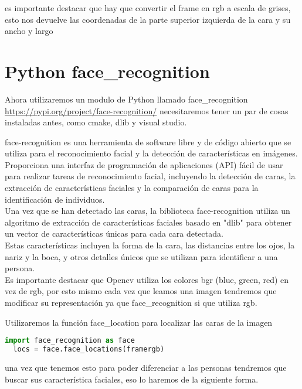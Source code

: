 es importante destacar que hay que convertir el frame en rgb a escala de grises,
esto nos devuelve las coordenadas de la parte superior izquierda de la cara y su 
ancho y largo




\section{Python face\_recognition}

Ahora utilizaremos un modulo de Python llamado face\_recognition
\url{https://pypi.org/project/face-recognition/}
necesitaremos tener un par de cosas instaladas antes, como cmake, dlib y visual studio.

face-recognition es una herramienta de software libre y de código abierto
que se utiliza para el reconocimiento facial y la detección de características en imágenes.\\

Proporciona una interfaz de programación de aplicaciones (API) fácil de usar
para realizar tareas de reconocimiento facial, incluyendo la detección de caras,
la extracción de características faciales y la comparación de caras para
la identificación de individuos.\\

Una vez que se han detectado las caras, la biblioteca face-recognition
utiliza un algoritmo de extracción de características faciales basado en 
"dlib" para obtener un vector de características únicas para cada cara detectada.\\
Estas características incluyen la forma de la cara, las distancias entre los ojos,
la nariz y la boca, y otros detalles únicos que se utilizan para identificar a una persona.\\

Es importante destacar que Opencv utiliza los colores bgr (blue, green, red)
en vez de rgb, por esto mismo cada vez que leamos una imagen tendremos que modificar 
su representación ya que face\_recognition si que utiliza rgb.

Utilizaremos la función face\_location para localizar las caras de la imagen
\begin{lstlisting}[language=Python]
  import face_recognition as face
  locs = face.face_locations(framergb)
\end{lstlisting}

una vez que tenemos esto para poder diferenciar a las personas tendremos que buscar sus
característica faciales, eso lo haremos de la siguiente forma. 

